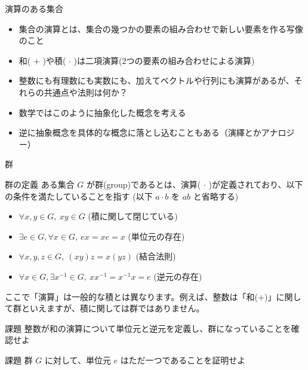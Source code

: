\documentclass[dvipdfmx,12pt,a4paper,handout]{beamer}
\begin{document}
\begin{frame}{演算のある集合}
 \begin{itemize}
  \item 集合の演算とは、集合の幾つかの要素の組み合わせで新しい要素を作る写像のこと
  \item 和( $+$ )や積( $\cdot$ )は二項演算(2つの要素の組み合わせによる演算)
  \item 整数にも有理数にも実数にも、加えてベクトルや行列にも演算があるが、それらの共通点や法則は何か？
  \item 数学ではこのように抽象化した概念を考える
  \item 逆に抽象概念を具体的な概念に落とし込むこともある（演繹とかアナロジー）
 \end{itemize}

\end{frame}

\begin{frame}{群}

 \begin{block}{群の定義}
  ある集合 $G$ が群(group)であるとは、演算( $\cdot$ )が定義されており、以下の条件を満たしていることを指す
  (以下 $a \cdot b$ を $ab$ と省略する)

  \begin{itemize}
  \item $\forall x, y \in G,\ xy \in G$ (積に関して閉じている)
  \item $\exists e \in G, \forall x \in G,\ ex = xe = x$ (単位元の存在)
  \item $\forall x, y, z \in G, \ (xy)z = x(yz)$ (結合法則)
  \item $\forall x \in G, \exists x^{-1} \in G,\ xx^{-1} = x^{-1}x = e$ (逆元の存在)
  \end{itemize}
 \end{block}

 ここで「演算」は一般的な積とは異なります。例えば、整数は「和($+$)」に関して群といえますが、積に関しては群ではありません。

 \begin{block}{課題}
  整数が和の演算について単位元と逆元を定義し、群になっていることを確認せよ
 \end{block}

 \begin{block}{課題}
  群 $G$ に対して、単位元 $e$ はただ一つであることを証明せよ
 \end{block}

\end{frame}
\end{document}
